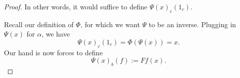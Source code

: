 \documentclass[12pt]{article}
\theoremstyle{definition}
\newcommand{\<}{\langle}
\renewcommand{\>}{\rangle}
\begin{document}
\begin{proof}
    In other words, it would suffice to define $\Psi(x)_c(1_c)$.
    
    Recall our definition of $\Phi$, for which we want $\Psi$ to be an inverse.
    Plugging in $\Psi(x)$ for $\alpha$, we have
    \[
        \Psi(x)_c(1_c) = \Phi(\Psi(x)) = x.
    \]
    Our hand is now forces to define
    \[
        \Psi(x)_b(f) := Ff(x).
    \]

    

\end{proof}
\end{document}
